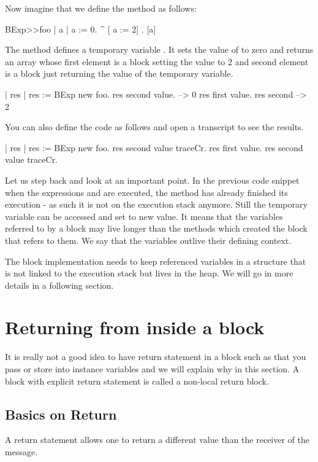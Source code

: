 \documentclass[a4paper,10pt,twoside]{book}
\begin{document}
Now imagine that we define the method  as follows:

\begin{code}{}
BExp>>foo
	| a |
	a := 0. 
	^ {[ a := 2] . [a]} 
\end{code}

The method  defines a temporary variable . It sets the value of 
to zero and returns an array whose first element is a block setting the value to 2 and second element is a block just returning the value of the temporary variable. 

\begin{code}{}
| res | 
res := BExp new foo.
res second value.
     --> 0
res first value.
res second
     --> 2
\end{code}

You can also define the code as follows and open a transcript to see the results.

\begin{code}
| res |
res := BExp new foo.
res second value traceCr.
res first value.
res second value traceCr.
\end{code}

Let us step back and look at an important point. 
In the previous code snippet when the expressions  and  are executed, the method  has already finished its execution - as such it is not on the execution stack anymore.  Still the temporary variable  can be accessed and set to new value. It means that the variables referred to by a block may live longer than the methods which created the block that refers to them. We say that the variables outlive their defining context. 

The block implementation needs to keep referenced variables in a structure that is not linked to the execution stack but lives in the heap. We will go in more details in a following section. 



\section{Returning from inside a block}
It is really not a good idea to have return statement in a block such as \ct{[^ 33]} that you pass or store into instance variables and we will explain why in this section. A block with explicit return statement is called a  non-local return block. 

\subsection{Basics on Return}
A return statement allows one to return a different value than the receiver of the message.
\end{document}
